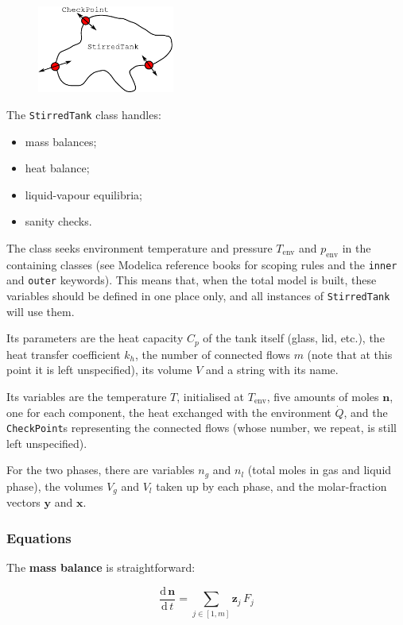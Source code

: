 \documentclass[a4paper]{article}
\renewcommand{\d}{\ensuremath{\mathrm{d}}}
\newcommand{\der}[2]{\ensuremath{\frac{\d \, #1}{\d \, #2}}}
\begin{document}
\begin{figure}[h]
\centering
\includegraphics[width=0.4\textwidth]{pics/stirredtank}
\end{figure}

The \texttt{StirredTank} class handles:
\begin{itemize}
\item mass balances;
\item heat balance;
\item liquid-vapour equilibria;
\item sanity checks.
\end{itemize}

The class seeks environment temperature and pressure $T_\text{env}$ and
$p_\text{env}$ in the containing classes (see Modelica reference books for
scoping rules and the \texttt{inner} and \texttt{outer} keywords). This means
that, when the total model is built, these variables should be defined in one
place only, and all instances of \texttt{StirredTank} will use them.

Its parameters are the heat capacity $C_p$ of the tank itself (glass, lid,
etc.), the heat transfer coefficient $k_h$, the number of connected flows $m$
(note that at this point it is left unspecified), its volume $V$ and a string
with its name.

Its variables are the temperature $T$, initialised at $T_\text{env}$, five
amounts of moles $\mathbf{n}$, one for each component, the heat exchanged with
the environment $\dot Q$, and the \texttt{CheckPoint}s representing the
connected flows (whose number, we repeat, is still left unspecified).

For the two phases, there are variables $n_g$ and $n_l$ (total moles in gas and
liquid phase), the volumes $V_g$ and $V_l$ taken up by each phase, and the
molar-fraction vectors $\mathbf{y}$ and $\mathbf{x}$.

\subsubsection{Equations}
The \textbf{mass balance} is straightforward:

\begin{equation}
\der{\mathbf{n}}{t} = \sum_{j \in [1, m]} \mathbf{z}_j\,F_j
\end{equation}
\end{document}
